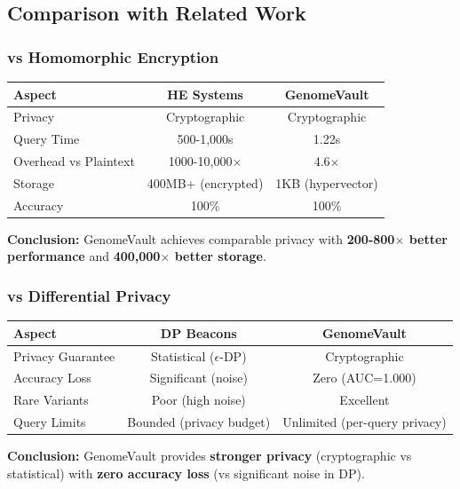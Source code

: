 \documentclass[11pt,a4paper]{article}
\begin{document}
\subsection{Comparison with Related Work}

\subsubsection{vs Homomorphic Encryption}

\begin{table}[H]
\centering
\begin{tabular}{lcc}
\toprule
\textbf{Aspect} & \textbf{HE Systems} & \textbf{GenomeVault} \\
\midrule
Privacy & Cryptographic & Cryptographic \\
Query Time & 500-1,000s & 1.22s \\
Overhead vs Plaintext & 1000-10,000$\times$ & 4.6$\times$ \\
Storage & 400MB+ (encrypted) & 1KB (hypervector) \\
Accuracy & 100\% & 100\% \\
\bottomrule
\end{tabular}
\end{table}

\textbf{Conclusion:} GenomeVault achieves comparable privacy with \textbf{200-800$\times$ better performance} and \textbf{400,000$\times$ better storage}.

\subsubsection{vs Differential Privacy}

\begin{table}[H]
\centering
\begin{tabular}{lcc}
\toprule
\textbf{Aspect} & \textbf{DP Beacons} & \textbf{GenomeVault} \\
\midrule
Privacy Guarantee & Statistical ($\epsilon$-DP) & Cryptographic \\
Accuracy Loss & Significant (noise) & Zero (AUC=1.000) \\
Rare Variants & Poor (high noise) & Excellent \\
Query Limits & Bounded (privacy budget) & Unlimited (per-query privacy) \\
\bottomrule
\end{tabular}
\end{table}

\textbf{Conclusion:} GenomeVault provides \textbf{stronger privacy} (cryptographic vs statistical) with \textbf{zero accuracy loss} (vs significant noise in DP).
\end{document}
